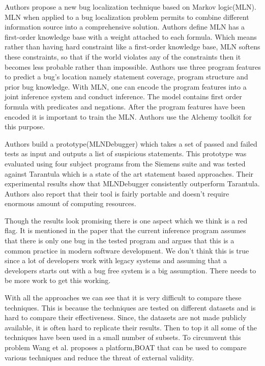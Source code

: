 \documentclass[10pt, conference, compsocconf]{IEEEtran}
\begin{document}
Authors propose a new bug localization technique based on Markov logic(MLN). MLN when applied to a bug localization problem permits to combine different information source into a comprehensive solution. Authors define MLN  has a first-order knowledge base with a weight attached to each formula. Which means rather than having hard constraint like a first-order knowledge base, MLN softens these constraints, so that if the world violates any of the constraints then it becomes less probable rather than impossible. Authors use three program features to predict a bug’s location namely statement coverage, program structure and prior bug knowledge. With MLN, one can encode the program features into a joint inference system and conduct inference. The model contains first order formula with predicates and negations. After the program features have been encoded it is important to train the MLN. Authors use the Alchemy toolkit for this purpose. 

Authors build a prototype(MLNDebugger) which takes a set of passed and failed tests as input and outputs a list of suspicious statements. This prototype was evaluated using four subject programs from the Siemens suite and was tested against Tarantula which is a state of the art statement based approaches. Their experimental results show that MLNDebugger consistently outperform Tarantula. Authors also report that their tool is fairly portable and doesn’t require enormous amount of computing resources.

Though the results look promising there is one aspect which we think is a red flag. It is mentioned in the paper that the current inference program assumes that there is only one bug in the tested program and argues that this is a common practice in modern software development.  We don’t think this is true since a lot of developers work with legacy systems and assuming that a developers starts out with a bug free system is a big assumption. There needs to be more work to get this working.

With all the approaches we can see that it is very difficult to compare these techniques. This is because the techniques are tested on different  datasets and is hard to compare their effectiveness. Since, the datasets are not made publicly available, it is often hard to replicate their results. Then to top it all some of the techniques have been used in a small number of subsets. To circumvent this problem Wang et al.\cite{wang2014boat} proposes a platform,BOAT that can be used to compare various techniques and reduce the threat of external validity.
\end{document}

